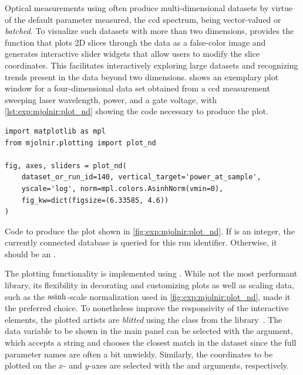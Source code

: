 Optical measurements using \mjolnir often produce multi-dimensional datasets by virtue of the default parameter measured, the \gls{ccd} spectrum, being vector-valued or \emph{batched}.
To visualize such datasets with more than two dimensions, \mjolnir provides the  function that plots 2D slices through the data as a false-color image and generates interactive slider widgets that allow users to modify the slice coordinates.
This facilitates interactively exploring large datasets and recognizing trends present in the data beyond two dimensions.
 shows an exemplary plot window for a four-dimensional data set obtained from a \gls{ccd} measurement sweeping laser wavelength, power, and a gate voltage, with \cref{lst:exp:mjolnir:plot_nd} showing the code necessary to produce the plot.

\begin{listing}
    \begin{verbatim}
import matplotlib as mpl
from mjolnir.plotting import plot_nd

fig, axes, sliders = plot_nd(
    dataset_or_run_id=140, vertical_target='power_at_sample',
    yscale='log', norm=mpl.colors.AsinhNorm(vmin=0),
    fig_kw=dict(figsize=(6.33585, 4.6))
)
    \end{verbatim}
    \caption[\texttt{plot_nd()} example]{
        Code to produce the plot shown in \cref{fig:exp:mjolnir:plot_nd}.
        If  is an integer, the currently connected \qcodes database is queried for this run identifier.
        Otherwise, it should be an \xarray {}.
    }
    \label{lst:exp:mjolnir:plot_nd}
\end{listing}

The plotting functionality is implemented using \matplotlib.
While not the most performant library, its flexibility in decorating and customizing plots as well as scaling data, such as the $\operatorname{asinh}$-scale normalization used in \cref{fig:exp:mjolnir:plot_nd}, made it the preferred choice.
To nonetheless improve the responsivity of the interactive elements, the plotted artists are \emph{blitted}
using the  class from the \qutil library~\cite{Hangleiter_qutil}.
The data variable to be shown in the main panel can be selected with the  argument, which accepts a string and chooses the closest match in the dataset since the full parameter names are often a bit unwieldy.
Similarly, the coordinates to be plotted on the $x$- and $y$-axes are selected with the  and  arguments, respectively.


